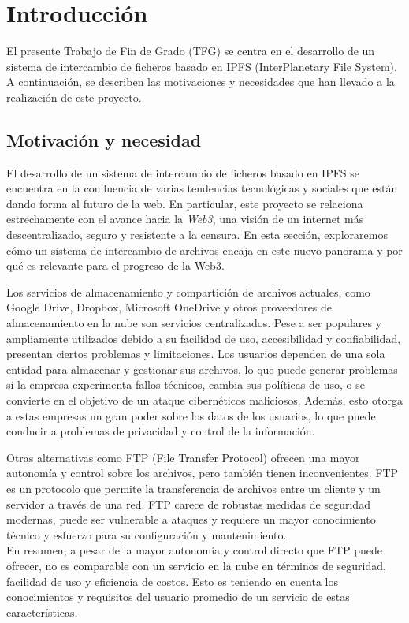 
\chapter{Introducción}\label{chap:1introduccion}
El presente Trabajo de Fin de Grado (TFG) se centra en el desarrollo de un sistema de intercambio de ficheros basado en
IPFS (InterPlanetary File System)\cite{IPFSPowersDistributed}.
\\A continuación, se describen las motivaciones y necesidades que han llevado a la realización de este proyecto.
\section{Motivación y necesidad}

El desarrollo de un sistema de intercambio de ficheros basado en IPFS se encuentra en la confluencia de varias tendencias
tecnológicas y sociales que están dando forma al futuro de la web. En particular, este proyecto se relaciona estrechamente
con el avance hacia la \textit{Web3}\cite{Web32023}, una visión de un internet más descentralizado, seguro y resistente a la censura.
En esta sección, exploraremos cómo un sistema de intercambio de archivos encaja en este nuevo panorama y por qué es relevante para el progreso de la Web3.

Los servicios de almacenamiento y compartición de archivos actuales, como Google Drive, Dropbox, Microsoft OneDrive y otros
proveedores de almacenamiento en la nube son servicios centralizados. Pese a ser  populares y ampliamente utilizados debido
a su facilidad de uso, accesibilidad y confiabilidad, presentan ciertos problemas y limitaciones. Los usuarios dependen de una
sola entidad para almacenar y gestionar sus archivos, lo que puede generar problemas si la empresa experimenta fallos técnicos,
cambia sus políticas de uso, o se convierte en el objetivo de un ataque cibernéticos maliciosos.
Además, esto otorga a estas empresas un gran poder sobre los datos de los usuarios, lo que puede conducir a problemas de privacidad y control de la información.

Otras alternativas como FTP (File Transfer Protocol) ofrecen una mayor autonomía y control sobre los archivos, pero también
tienen inconvenientes. FTP es un protocolo que permite la transferencia de archivos
entre un cliente y un servidor a través de una red. FTP carece de robustas medidas de seguridad modernas, puede ser vulnerable
a ataques y requiere un mayor conocimiento técnico y esfuerzo para su configuración y mantenimiento.
\\En resumen, a pesar de la mayor autonomía y control directo que FTP
puede ofrecer, no es comparable con un servicio en la nube en términos de seguridad, facilidad de uso y eficiencia de costos.
Esto es teniendo en cuenta los conocimientos y requisitos del usuario promedio de un servicio de estas características.

